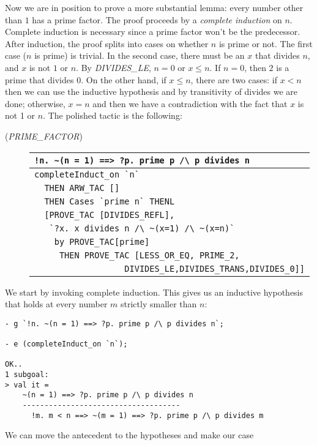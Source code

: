 Now we are in position to prove a more substantial lemma: every number
other than $1$ has a prime factor. The proof proceeds by a
\emph{complete induction} on $n$. Complete induction is
necessary since a prime factor won't be the predecessor. After
induction, the proof splits into cases on whether $n$ is prime or
not. The first case ($n$ is prime) is
trivial. In the second case, there must be an $x$ that divides $n$, and
$x$ is not $1$ or $n$. By {\small\it DIVIDES\_LE}, $n=0$ or $x \leq n$. If
$n=0$, then $2$ is a prime that divides $0$. On the other hand, if $x \leq
n$, there are two cases: if $x < n$ then we can use the inductive
hypothesis and by transitivity of divides we are done; otherwise,
$x=n$ and then we have a contradiction with the fact that $x$ is not 1
or $n$.  The polished tactic is the following:
\begin{description}
\item [\small{({\it PRIME\_FACTOR\/})}]
\begin{tabular}[t]{l}
\verb+!n. ~(n = 1) ==> ?p. prime p /\ p divides n+ \\ \hline
\verb+completeInduct_on `n`+ \\
\verb+  THEN ARW_TAC []+ \\
\verb+  THEN Cases `prime n` THENL+ \\
\verb+  [PROVE_TAC [DIVIDES_REFL], + \\
\verb+   `?x. x divides n /\ ~(x=1) /\ ~(x=n)` + \\
\verb+    by PROVE_TAC[prime]+ \\
\verb+     THEN PROVE_TAC [LESS_OR_EQ, PRIME_2, +\\
\verb+                  DIVIDES_LE,DIVIDES_TRANS,DIVIDES_0]]+ \\
\end{tabular}
\end{description}
We start by invoking complete induction. This gives us an inductive
hypothesis that holds at every number $m$ strictly smaller than $n$:
\begin{session}\begin{verbatim}
- g `!n. ~(n = 1) ==> ?p. prime p /\ p divides n`;

- e (completeInduct_on `n`);

OK..
1 subgoal:
> val it =
    ~(n = 1) ==> ?p. prime p /\ p divides n
    ------------------------------------
      !m. m < n ==> ~(m = 1) ==> ?p. prime p /\ p divides m
\end{verbatim}\end{session}
We can move the antecedent to the hypotheses and make our case
